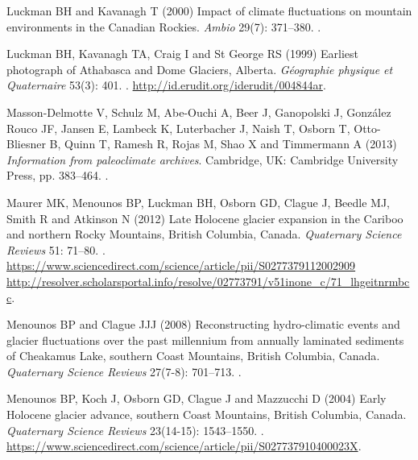 \documentclass[Royal,times,doublespace,sageh]{sagej}
\begin{document}
\begin{thebibliography}{68}
{
Luckman BH and Kavanagh T (2000) {Impact of climate fluctuations on mountain
  environments in the Canadian Rockies}.
\newblock \emph{Ambio} 29(7): 371--380.
\newblock {}.

Luckman BH, Kavanagh TA, Craig I and {St George} RS (1999) {Earliest photograph
  of Athabasca and Dome Glaciers, Alberta}.
\newblock \emph{G{\'{e}}ographie physique et Quaternaire} 53(3): 401.
\newblock {}.
\newblock \urlprefix\url{http://id.erudit.org/iderudit/004844ar}.

Masson-Delmotte V, Schulz M, Abe-Ouchi A, Beer J, Ganopolski J, {Gonz{\'{a}}lez
  Rouco} JF, Jansen E, Lambeck K, Luterbacher J, Naish T, Osborn T,
  Otto-Bliesner B, Quinn T, Ramesh R, Rojas M, Shao X and Timmermann A (2013)
  \emph{{Information from paleoclimate archives}}.
\newblock Cambridge, UK: Cambridge University Press, pp. 383--464.
\newblock {}.

Maurer MK, Menounos BP, Luckman BH, Osborn GD, Clague J, Beedle MJ, Smith R and
  Atkinson N (2012) {Late Holocene glacier expansion in the Cariboo and
  northern Rocky Mountains, British Columbia, Canada}.
\newblock \emph{Quaternary Science Reviews} 51: 71--80.
\newblock {}.
\newblock
  \urlprefix\url{https://www.sciencedirect.com/science/article/pii/S0277379112002909
  http://resolver.scholarsportal.info/resolve/02773791/v51inone_c/71_lhgeitnrmbcc}.

Menounos BP and Clague JJJ (2008) {Reconstructing hydro-climatic events and
  glacier fluctuations over the past millennium from annually laminated
  sediments of Cheakamus Lake, southern Coast Mountains, British Columbia,
  Canada}.
\newblock \emph{Quaternary Science Reviews} 27(7-8): 701--713.
\newblock {}.

Menounos BP, Koch J, Osborn GD, Clague J and Mazzucchi D (2004) {Early Holocene
  glacier advance, southern Coast Mountains, British Columbia, Canada}.
\newblock \emph{Quaternary Science Reviews} 23(14-15): 1543--1550.
\newblock {}.
\newblock
  \urlprefix\url{https://www.sciencedirect.com/science/article/pii/S027737910400023X}.

}
\end{thebibliography}
\end{document}
